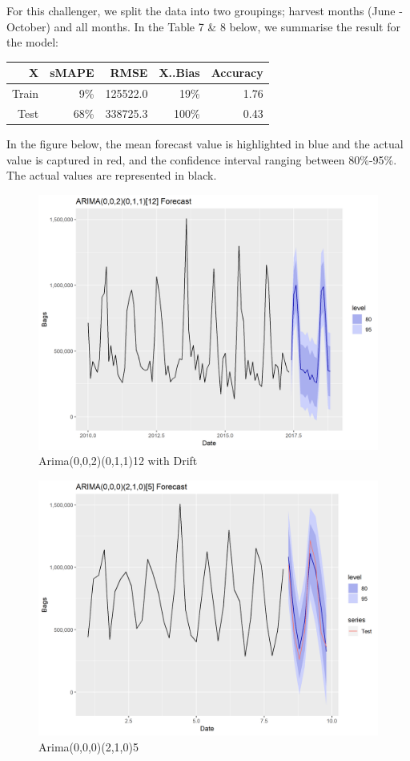 \documentclass[12pt,oneside]{chicagocapstone}
\begin{document}
For this challenger, we split the data into two groupings; harvest
months (June -October) and all months. In the Table 7 \& 8 below, we
summarise the result for the model:
\begin{longtable}[]{@{}rrrrr@{}}
\toprule
X & sMAPE & RMSE & X..Bias & Accuracy\tabularnewline
\midrule
\endhead
Train & 9\% & 125522.0 & 19\% & 1.76\tabularnewline
Test & 68\% & 338725.3 & 100\% & 0.43\tabularnewline
\bottomrule
\end{longtable}
In the figure below, the mean forecast value is highlighted in blue and
the actual value is captured in red, and the confidence interval ranging
between 80\%-95\%. The actual values are represented in black.
\begin{figure}
\centering
\includegraphics{./figure/Arima_12month.png}
\caption{Arima(0,0,2)(0,1,1)12 with Drift}
\end{figure}
\begin{figure}
\centering
\includegraphics{./figure/HarvestArima.png}
\caption{Arima(0,0,0)(2,1,0)5}
\end{figure}
\end{document}
